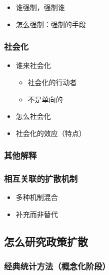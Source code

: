 \documentclass[
  12pt,
]{ctexart}
\begin{document}
\begin{itemize}
\item
  谁强制，强制谁
\item
  怎么强制：强制的手段
\end{itemize}

\hypertarget{ux793eux4f1aux5316}{%
\subsubsection{社会化}\label{ux793eux4f1aux5316}}

\begin{itemize}
\item
  谁来社会化

  \begin{itemize}
  \item
    社会化的行动者
  \item
    不是单向的
  \end{itemize}
\item
  怎么社会化
\item
  社会化的效应（特点）
\end{itemize}

\hypertarget{ux5176ux4ed6ux89e3ux91ca}{%
\subsubsection{其他解释}\label{ux5176ux4ed6ux89e3ux91ca}}

\hypertarget{ux76f8ux4e92ux5173ux8054ux7684ux6269ux6563ux673aux5236}{%
\subsubsection{相互关联的扩散机制}\label{ux76f8ux4e92ux5173ux8054ux7684ux6269ux6563ux673aux5236}}

\begin{itemize}
\item
  多种机制混合
\item
  补充而非替代
\end{itemize}

\hypertarget{ux600eux4e48ux7814ux7a76ux653fux7b56ux6269ux6563}{%
\subsection{怎么研究政策扩散}\label{ux600eux4e48ux7814ux7a76ux653fux7b56ux6269ux6563}}

\hypertarget{ux7ecfux5178ux7edfux8ba1ux65b9ux6cd5ux6982ux5ff5ux5316ux9636ux6bb5}{%
\subsubsection{经典统计方法（概念化阶段）}\label{ux7ecfux5178ux7edfux8ba1ux65b9ux6cd5ux6982ux5ff5ux5316ux9636ux6bb5}}
\end{document}
